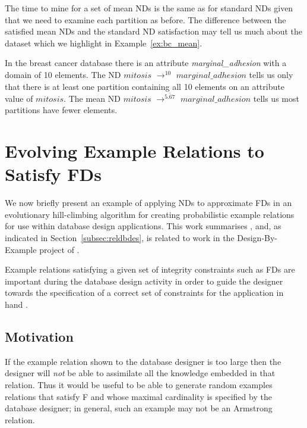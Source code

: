 The time to mine for a set of mean NDs is the same as for standard
NDs given that we need to examine each partition as before.
The difference between the satisfied mean NDs and the standard ND
satisfaction may tell us much about the dataset which we highlight in
Example~\ref{ex:bc_mean}.

\begin{example}\label{ex:bc_mean}
\begin{rm}
In the breast cancer database there is an attribute {\em
marginal\_adhesion} with a domain of 10 elements. The ND $mitosis$
$\to^{10}$ $marginal\_adhesion$ tells
us only that there is at least one partition containing all 10
elements on an attribute value of
$mitosis$. The mean ND $mitosis$ $\to^{\bar{5.67}}$
$marginal\_adhesion$ tells us most partitions have fewer elements.
\end{rm}
\end{example}


\section{Evolving Example Relations to Satisfy FDs}\label{sec:nd_evolve}
We now briefly present an example of applying NDs to approximate FDs
in an evolutionary hill-climbing algorithm for creating probabilistic
example relations for use within database design applications. This
work summarises \cite{cl98}, and, as indicated in
Section~\ref{subsec:reldbdes}, is related to work in the
Design-By-Example project of \cite{mr86}.

\smallskip

Example relations satisfying a given set of integrity constraints such as 
FDs are important during the database design 
activity in order to guide the designer towards the specification of a correct 
set of constraints for the application in hand \cite{sm81}. 



\subsection{Motivation}

If the example relation shown to the database designer is too large then 
the designer will {\em not} be able to assimilate all the knowledge embedded in
that relation. Thus it would be useful to be able to generate random examples 
relations that satisfy F and whose maximal cardinality is specified by the 
database designer; in general, such an example may not be an Armstrong
relation.

